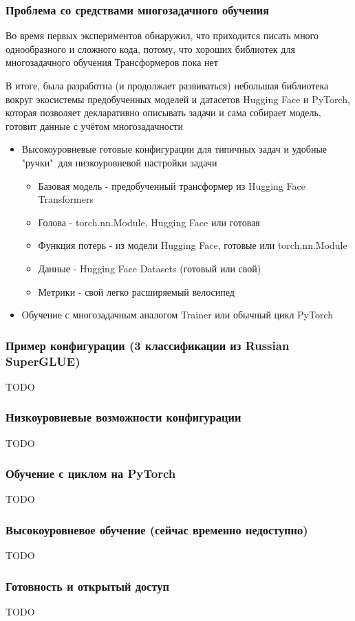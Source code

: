 \documentclass[aspectratio=169]{beamer}
\begin{document}
\begin{frame}
	\frametitle{Проблема со средствами многозадачного обучения}
	Во время первых экспериментов обнаружил, что приходится писать много однообразного и сложного кода, потому, что хороших библиотек для многозадачного обучения Трансформеров пока нет

	В итоге, была разработна (и продолжает развиваться) небольшая библиотека вокруг экосистемы предобученных моделей и датасетов Hugging Face и PyTorch, которая позволяет декларативно описывать задачи и сама собирает модель, готовит данные с учётом многозадачности
	\begin{itemize}
		\item Высокоуровневые готовые конфигурации для типичных задач и удобные "ручки"\ для низкоуровневой настройки задачи
		\begin{itemize}
			\item Базовая модель - предобученный трансформер из Hugging Face Transformers
			\item Голова - torch.nn.Module, Hugging Face или готовая
			\item Функция потерь - из модели Hugging Face, готовые или torch.nn.Module
			\item Данные - Hugging Face Datasets (готовый или свой)
			\item Метрики - свой легко расширяемый велосипед
		\end{itemize}
		\item Обучение с многозадачным аналогом Trainer или обычный цикл PyTorch
	\end{itemize}
\end{frame}

\begin{frame}
	\frametitle{Пример конфигурации (3 классификации из Russian SuperGLUE)}
	TODO
\end{frame}

\begin{frame}
	\frametitle{Низкоуровневые возможности конфигурации}
	TODO
\end{frame}

\begin{frame}
	\frametitle{Обучение с циклом на PyTorch}
	TODO
\end{frame}

\begin{frame}
	\frametitle{Высокоуровневое обучение (сейчас временно недоступно)}
	TODO
\end{frame}

\begin{frame}
	\frametitle{Готовность и открытый доступ}
	TODO
\end{frame}
\end{document}
